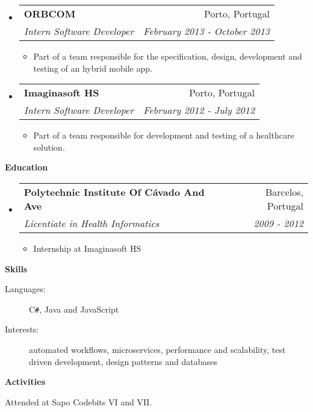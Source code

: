 \documentclass[letterpaper,11pt]{article}
\makeatletter
\newcommand{\resitem}[1]{\item #1 \vspace{-2pt}}
\newcommand{\resheading}[1]{{\large \colorbox{mygrey}{\begin{minipage}{\textwidth}{\textbf{#1 \vphantom{p\^{E}}}}\end{minipage}}}}
\newcommand{\ressubheading}[4]{
	\begin{tabular*}{7.0in}{l@{\extracolsep{\fill}}r}
		\textbf{#1} & #2 \\
		\textit{#3} & \textit{#4} \\
	\end{tabular*}\vspace{-6pt}}
\makeatother
\begin{document}
\begin{itemize}
		\item
		\ressubheading{ORBCOM}{Porto, Portugal}{Intern Software Developer}{February 2013 - October 2013}
		\begin{itemize}
			\resitem{Part of a team responsible for the specification, design, development and testing of an hybrid mobile app.}
		\end{itemize}
		
		\item
		\ressubheading{Imaginasoft HS}{Porto, Portugal}{Intern Software Developer}{February 2012 - July 2012}
		\begin{itemize}
			\resitem{Part of a team responsible for development and testing of a healthcare solution.}
		\end{itemize}
	\end{itemize}

\resheading{Education}
	\begin{itemize}
		\item
		\ressubheading{Polytechnic Institute Of C\'avado And Ave}{Barcelos, Portugal}{Licentiate in Health Informatics}{2009 - 2012}
		\begin{itemize}
			\resitem{Internship at Imaginasoft HS}
		\end{itemize}
		
	\end{itemize}
	
	
	\resheading{Skills}
	
	\begin{description}
		\item[Languages:]
		C{}\verb!#!, Java and JavaScript
		\item[Interests:]
		automated workflows, microservices, performance and scalability, test driven development, design patterns and databases
	\end{description}	
	
	\resheading{Activities}
	
	\begin{description}
		\item[Attended at Sapo Codebits VI and VII.]
	\end{description}
	
\end{document}
